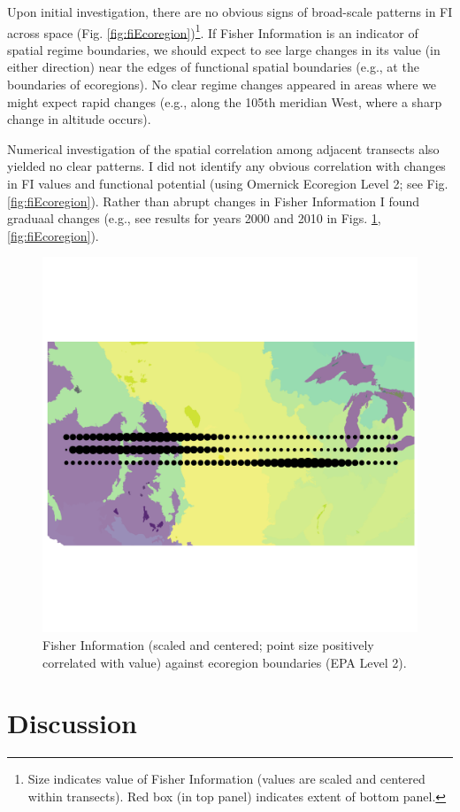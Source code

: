 \documentclass[12pt,twoside,openany]{reedthesis}
\begin{document}
Upon initial investigation, there are no obvious signs of broad-scale patterns in FI across space (Fig. \ref{fig:fiEcoregion})\footnote{Size indicates value of Fisher Information (values are scaled and centered within transects). Red box (in top panel) indicates extent of bottom panel.}. If Fisher Information is an indicator of spatial regime boundaries, we should expect to see large changes in its value (in either direction) near the edges of functional spatial boundaries (e.g., at the boundaries of ecoregions). No clear regime changes appeared in areas where we might expect rapid changes (e.g., along the 105th meridian West, where a sharp change in altitude occurs).

Numerical investigation of the spatial correlation among adjacent transects also yielded no clear patterns. I did not identify any obvious correlation with changes in FI values and functional potential (using Omernick Ecoregion Level 2; see Fig. \ref{fig:fiEcoregion}). Rather than abrupt changes in Fisher Information I found graduaal changes (e.g., see results for years 2000 and 2010 in Figs. \ref{fig:fiEcoregion00},\ref{fig:fiEcoregion}).
\begin{figure}
\includegraphics[width=0.85\linewidth]{./chapterFiles/fisherSpatial/figures/figsCalledInDiss/scaledFiInterpolated_year2000_East-West} \caption{Fisher Information (scaled and centered; point size positively correlated with value) against ecoregion boundaries (EPA Level 2).}\label{fig:fiEcoregion00}
\end{figure}
\hypertarget{discussion-2}{%
\section{Discussion}\label{discussion-2}}
\end{document}
